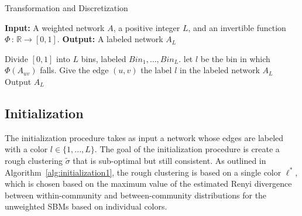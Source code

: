 \begin{algorithm}
\caption{Transformation and Discretization}
\label{alg:transform_and_discretize}
\textbf{Input:} A weighted network $A$, a positive integer $L$, and an invertible function $\Phi \,:\, \mathbb{R} \rightarrow [0,1]$.
\textbf{Output:} A labeled network $A_L$ \\

\begin{algorithmic}
\State Divide $[0,1]$ into $L$ bins, labeled $Bin_1, \dots, Bin_L$.
   \State let $l$ be the bin in which $\Phi(A_{uv})$ falls.
   \State Give the edge $(u,v)$ the label $l$ in the labeled network $A_L$
\EndFor
\State Output $A_L$
\end{algorithmic}
\end{algorithm}

\subsection{Initialization}

The initialization procedure takes as input a network whose edges are labeled with a color $l \in \{1, ..., L\}$. The goal of the initialization procedure is create a rough clustering $\tilde{\sigma}$ that is sub-optimal but still consistent. As outlined in Algorithm~\ref{alg:initialization1}, the rough clustering is based on a single color $\ell^*$, which is chosen based on the maximum value of the estimated Renyi divergence between within-community and between-community distributions for the unweighted SBMs based on individual colors.

